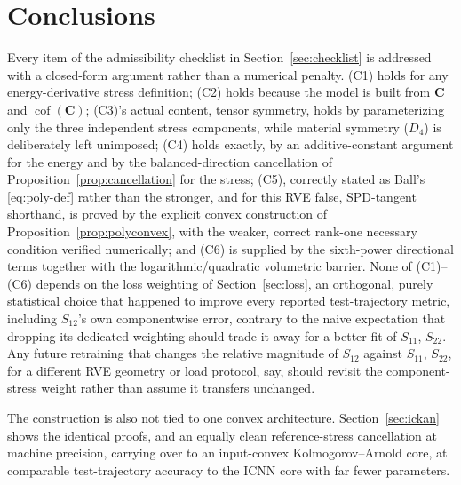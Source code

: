 \documentclass[10pt,a4paper]{article}
\newcommand{\Cof}{\operatorname{cof}}
\begin{document}
\section{Conclusions}
\label{sec:conclusions}
Every item of the admissibility checklist in Section~\ref{sec:checklist}
is addressed with a closed-form argument rather than a numerical
penalty. (C1) holds for any energy-derivative stress definition; (C2)
holds because the model is built from $\bm C$ and $\Cof(\bm C)$; (C3)'s
actual content, tensor symmetry, holds by parameterizing only the three
independent stress components, while material symmetry ($D_4$) is
deliberately left unimposed; (C4) holds exactly, by an additive-constant
argument for the energy and by the balanced-direction cancellation of
Proposition~\ref{prop:cancellation} for the stress; (C5), correctly
stated as Ball's \eqref{eq:poly-def} rather than the stronger, and for
this RVE false, SPD-tangent shorthand, is proved by the explicit convex
construction of Proposition~\ref{prop:polyconvex}, with the weaker,
correct rank-one necessary condition verified numerically; and (C6) is
supplied by the sixth-power directional terms together with the
logarithmic/quadratic volumetric barrier. None of (C1)--(C6) depends on
the loss weighting of Section~\ref{sec:loss}, an orthogonal, purely
statistical choice that happened to improve every reported test-trajectory metric, including $S_{12}$'s own componentwise error,
contrary to the naive expectation that dropping its dedicated weighting
should trade it away for a better fit of $S_{11}$, $S_{22}$. Any future
retraining that changes the relative magnitude of $S_{12}$ against
$S_{11}$, $S_{22}$, for a different RVE geometry or load protocol, say,
should revisit the component-stress weight rather than assume it
transfers unchanged.

The construction is also not tied to one convex architecture.
Section~\ref{sec:ickan} shows the identical proofs, and an equally clean
reference-stress cancellation at machine precision, carrying over to an
input-convex Kolmogorov--Arnold core, at comparable test-trajectory accuracy to the ICNN core with far fewer parameters.
\end{document}
